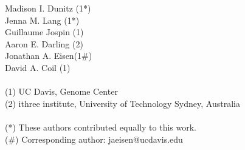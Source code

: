 Madison I. Dunitz (1*)\\
Jenna M. Lang (1*)\\Guillaume Jospin (1)\\
Aaron E. Darling (2)\\
Jonathan A. Eisen(1#)\\
David A. Coil (1) \\
\\
(1) UC Davis, Genome Center \\
(2) ithree institute, University of Technology Sydney, Australia\\
\\
(*) These authors contributed equally to this work. \\ 
(#) Corresponding author: jaeisen@ucdavis.edu
